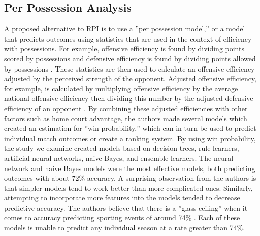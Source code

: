 \documentclass[sigconf]{acmart}
\begin{document}
\subsection{Per Possession Analysis}
A proposed alternative to RPI is to use a ''per possession model,'' or a model that predicts outcomes using statistics that are used in the context of efficiency with possessions. For example, offensive efficiency is found by dividing points scored by possessions and defensive efficiency is found by dividing points allowed by possessions \cite{PerPossession}. These statistics are then used to calculate an offensive efficiency adjusted by the perceived strength of the opponent. Adjusted offensive efficiency, for example, is calculated by multiplying offensive efficiency by the average national offensive efficiency then dividing this number by the adjusted defensive efficiency of an opponent \cite{PerPossession}. By combining these adjusted efficiencies with other factors such as home court advantage, the authors made several models which created an estimation for ''win probability,'' which can in turn be used to predict individual match outcomes or create a ranking system. By using win probability, the study we examine created models based on decision trees, rule learners, artificial neural networks, naive Bayes, and ensemble learners. The neural network and naive Bayes models were the most effective models, both predicting outcomes with about 72\% accuracy\cite{PerPossession}. A surprising observation from the authors is that simpler models tend to work better than more complicated ones. Similarly, attempting to incorporate more features into the models tended to decrease predictive accuracy. The authors believe that there is a ''glass ceiling'' when it comes to accuracy predicting sporting events of around 74\% \cite{PerPossession}. Each of these models is unable to predict any individual season at a rate greater than 74\%\cite{PerPossession}. \cite{paper2}
\end{document}
